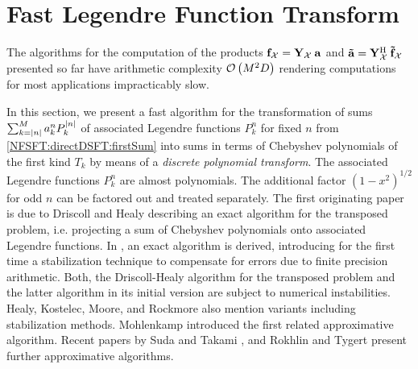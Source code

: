 \section{Fast Legendre Function Transform}
\label{DSFT:FLFT}
The algorithms for the computation of the products $\mathbf{f}_{\mathcal{X}} = \mathbf{Y}_{\mathcal{X}} \: \mathbf{a}$ and 
$\mathbf{\tilde{a}} = \mathbf{Y}_{\mathcal{X}}^{\text{\rm{H}}} \: \mathbf{\tilde{f}}_{\mathcal{X}}$ presented so far have 
arithmetic complexity $\mathcal{O}\left(M^2D\right)$ rendering computations for most applications impracticably slow. 

In this section, we present a fast algorithm for the transformation of sums 
$\sum_{k=\left\vert n\right\vert}^M a_{k}^n P_{k}^{\left\vert n\right\vert}$ of associated Legendre functions $P_{k}^n$ for fixed $n$ 
from \eqref{NFSFT:directDSFT:firstSum} into sums 
in terms of Chebyshev polynomials of the first kind $T_{k}$ by means of a \emph{discrete polynomial transform}. 
The associated Legendre functions $P_{k}^n$ are almost polynomials. The additional 
factor $(1-x^2)^{1/2}$ for odd $n$ can be factored out and treated separately. The first originating
paper \cite{drhe} is due to Driscoll and Healy describing an exact algorithm for the transposed
problem, i.e. projecting a sum of Chebyshev polynomials onto associated Legendre functions. 
In \cite{postta97}, an exact algorithm is derived, introducing for the first time a stabilization 
technique to compensate for errors due to finite precision arithmetic. Both, the Driscoll-Healy algorithm 
for the transposed problem and the latter algorithm in its initial version are subject to 
numerical instabilities. Healy, Kostelec, Moore, and Rockmore \cite{HeRoKoMo} also mention variants including stabilization methods. Mohlenkamp \cite{Mo99} introduced the first related approximative algorithm. 
Recent papers by Suda and Takami \cite{suta}, and Rokhlin and Tygert \cite{roty} present further 
approximative algorithms. 

